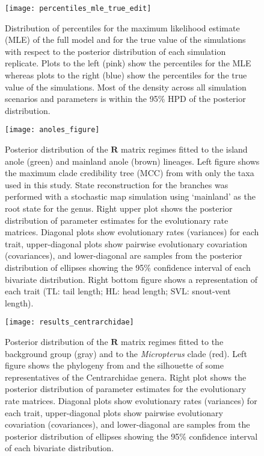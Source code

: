 \begin{figure}[h]
	\centering
	\texttt{[image: percentiles\_mle\_true\_edit]}
	\caption[Distribution of percentiles for the maximum likelihood estimate (MLE) of the full model and for the true value of the simulations with respect to the posterior distribution of each simulation replicate.]{Distribution of percentiles for the maximum likelihood estimate (MLE) of the full model and for the true value of the simulations with respect to the posterior distribution of each simulation replicate. Plots to the left (pink) show the percentiles for the MLE whereas plots to the right (blue) show the percentiles for the true value of the simulations. Most of the density across all simulation scenarios and parameters is within the 95\% HPD of the posterior distribution.}
	\label{fig:quantiles}
\end{figure}

\begin{figure}[h]
	\centering
	\texttt{[image: anoles\_figure]}
	\caption[Posterior distribution of the $\mathbf{R}$ matrix regimes fitted to the island anole (green) and mainland anole (brown) lineages.]{Posterior distribution of the $\mathbf{R}$ matrix regimes fitted to the island anole (green) and mainland anole (brown) lineages. Left figure shows the maximum clade credibility tree (MCC) from \citet{gamble_anolis_2014} with only the taxa used in this study. State reconstruction for the branches was performed with a stochastic map simulation using `mainland' as the root state for the genus. Right upper plot shows the posterior distribution of parameter estimates for the evolutionary rate matrices. Diagonal plots show evolutionary rates (variances) for each trait, upper-diagonal plots show pairwise evolutionary covariation (covariances), and lower-diagonal are samples from the posterior distribution of ellipses showing the 95\% confidence interval of each bivariate distribution. Right bottom figure shows a representation of each trait (TL: tail length; HL: head length; SVL: snout-vent length).}
	\label{fig:anoles}
\end{figure}

\begin{figure}[h]
	\centering
	\texttt{[image: results\_centrarchidae]}
	\caption[Posterior distribution of the $\mathbf{R}$ matrix regimes fitted to the background group and to the \textit{Micropterus} clade.]{Posterior distribution of the $\mathbf{R}$ matrix regimes fitted to the background group (gray) and to the \textit{Micropterus} clade (red). Left figure shows the phylogeny from \citep{revell_phylogenetic_2009} and the silhouette of some representatives of the Centrarchidae genera. Right plot shows the posterior distribution of parameter estimates for the evolutionary rate matrices. Diagonal plots show evolutionary rates (variances) for each trait, upper-diagonal plots show pairwise evolutionary covariation (covariances), and lower-diagonal are samples from the posterior distribution of ellipses showing the 95\% confidence interval of each bivariate distribution.}
	\label{fig:centrarchidae}
\end{figure}

